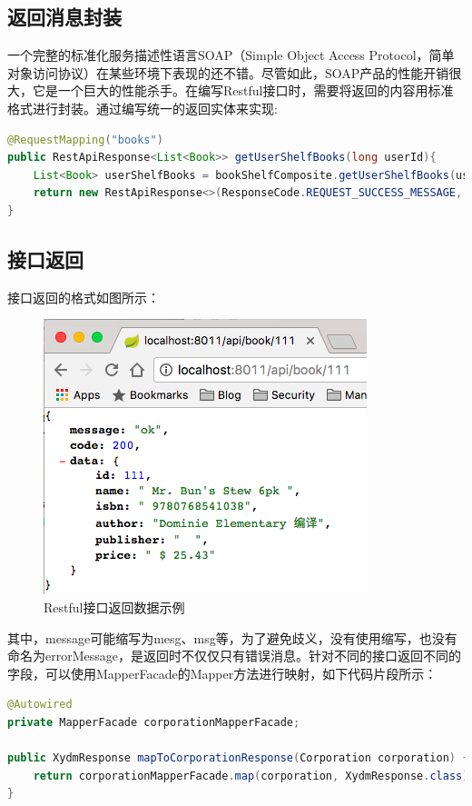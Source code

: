 \documentclass[letter]{book}
\begin{document}
\subsection{返回消息封装}

一个完整的标准化服务描述性语言SOAP（Simple Object Access Protocol，简单对象访问协议）在某些环境下表现的还不错。尽管如此，SOAP产品的性能开销很大，它是一个巨大的性能杀手。在编写Restful接口时，需要将返回的内容用标准格式进行封装。通过编写统一的返回实体来实现:

\begin{lstlisting}[language=Java]
@RequestMapping("books")
public RestApiResponse<List<Book>> getUserShelfBooks(long userId){
	List<Book> userShelfBooks = bookShelfComposite.getUserShelfBooks(userId);
	return new RestApiResponse<>(ResponseCode.REQUEST_SUCCESS_MESSAGE, ResponseCode.REQUEST_SUCCESS, userShelfBooks);
}
\end{lstlisting}


\subsection{接口返回}

接口返回的格式如图所示：

\begin{figure}[htbp]
	\centering
	\includegraphics[scale=0.6]{restresponse.png}
	\caption{Restful接口返回数据示例}
	\label{fig:restresponse}
\end{figure}

其中，message可能缩写为mesg、msg等，为了避免歧义，没有使用缩写，也没有命名为errorMessage，是返回时不仅仅只有错误消息。针对不同的接口返回不同的字段，可以使用MapperFacade的Mapper方法进行映射，如下代码片段所示：

\begin{lstlisting}[language=Java]
@Autowired
private MapperFacade corporationMapperFacade;

public XydmResponse mapToCorporationResponse(Corporation corporation) {
	return corporationMapperFacade.map(corporation, XydmResponse.class);
}
\end{lstlisting}
\end{document}
